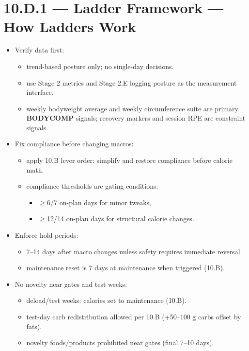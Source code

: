 \documentclass[10pt]{article}
\begin{document}
\section*{10.D.1 — Ladder Framework — How Ladders Work}
{}

\begin{itemize}
\item Verify data first:
  \begin{itemize}
  \item trend-based posture only; no single-day decisions.
  \item use Stage 2 metrics and Stage 2.E logging posture as the measurement interface.
  \item weekly bodyweight average and weekly circumference suite are primary \textbf{BODYCOMP} signals; recovery markers and session RPE are constraint signals.
  \end{itemize}
\item Fix compliance before changing macros:
  \begin{itemize}
  \item apply 10.B lever order: simplify and restore compliance before calorie math.
  \item compliance thresholds are gating conditions:
    \begin{itemize}
    \item $\geq$6/7 on-plan days for minor tweaks,
    \item $\geq$12/14 on-plan days for structural calorie changes.
    \end{itemize}
  \end{itemize}
\item Enforce hold periods:
  \begin{itemize}
  \item 7–14 days after macro changes unless safety requires immediate reversal.
  \item maintenance reset is 7 days at maintenance when triggered (10.B).
  \end{itemize}
\item No novelty near gates and test weeks:
  \begin{itemize}
  \item deload/test weeks: calories set to maintenance (10.B).
  \item test-day carb redistribution allowed per 10.B (+50–100 g carbs offset by fats).
  \item novelty foods/products prohibited near gates (final 7–10 days).

\end{itemize}
\end{itemize}
\end{document}
